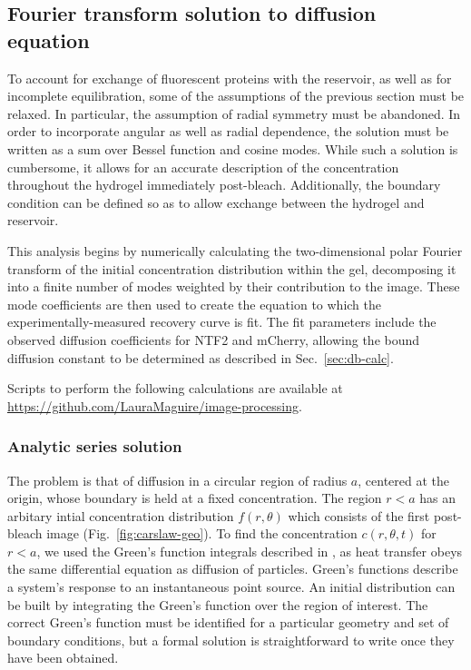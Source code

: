 \subsection{Fourier transform solution to diffusion equation}

To account for exchange of fluorescent proteins with the reservoir, as well as for incomplete equilibration, some of the assumptions of the previous section must be relaxed.  In particular, the assumption of radial symmetry must be abandoned.  In order to incorporate angular as well as radial dependence, the solution must be written as a sum over Bessel function and cosine modes.  While such a solution is cumbersome, it allows for an accurate description of the concentration throughout the hydrogel immediately post-bleach.  Additionally, the boundary condition can be defined so as to allow exchange between the hydrogel and reservoir.

This analysis begins by numerically calculating the two-dimensional polar Fourier transform of the initial concentration distribution within the gel, decomposing it into a finite number of modes weighted by their contribution to the image.  These mode coefficients are then used to create the equation to which the experimentally-measured recovery curve is fit.  The fit parameters include the observed diffusion coefficients for NTF2 and mCherry, allowing the bound diffusion constant to be determined as described in Sec.~\ref{sec:db-calc}.

Scripts to perform the following calculations are available at \url{https://github.com/LauraMaguire/image-processing}.

\subsubsection{Analytic series solution}

The problem is that of diffusion in a circular region of radius $a$, centered at the origin, whose boundary is held at a fixed concentration.  The region $r<a$ has an arbitary intial concentration distribution $f(r,\theta)$ which consists of the first post-bleach image (Fig.~\ref{fig:carslaw-geo}).  To find the concentration $c(r,\theta,t)$ for $r<a$, we used the Green's function integrals described in \cite{h.s.carslaw59}, as heat transfer obeys the same differential equation as diffusion of particles.  Green's functions describe a system's response to an instantaneous point source.  An initial distribution can be built by integrating the Green's function over the region of interest.  The correct Green's function must be identified for a particular geometry and set of boundary conditions, but a formal solution is straightforward to write once they have been obtained.

